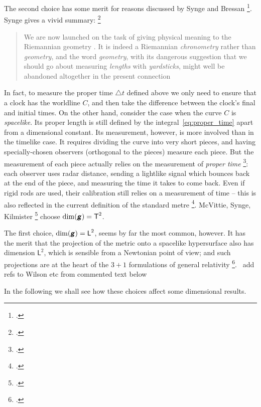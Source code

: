 \documentclass[\ifafour a4paper,12pt,\else a5paper,10pt,\fi%
onecolumn,oneside,article,%
british%
]{memoir}
\theoremstyle{remark}
\theoremstyle{innote}
\newcommand*{\mathte}[1]{\textbf{\textit{\textsf{#1}}}}
\newcommand*{\citep}{\footcites}
\newcommand*{\incr}{\triangle}%
\renewcommand*{\|}[1][]{\nonscript\,#1\vert\nonscript\;\mathopen{}}
\newcommand*{\sect}{\S}%
\newcommand*{\sects}{\S\S}%
\newcommand*{\chap}{ch.}%
\newcommand*{\puzzle}{{\fontencoding{U}\fontfamily{fontawesometwo}\selectfont\symbol{225}}}
\newcommand{\mynote}[1]{ {\color{notecolour}\puzzle\ #1}}
\newcommand*{\Le}{\textsf{L}}
\newcommand*{\Ti}{\textsf{T}}
\newcommand*{\yg}{\mathte{g}}
\newcommand*{\inct}{\incr t}
\begin{document}
The second choice has some merit for reasons discussed by Synge and Bressan
\citep[\sects~III.2--4]{synge1960b}[\sects~15, 18]{bressan1978}. Synge
gives a vivid summary: \citep[\sect~III.3 pp.~108--109]{synge1960b}
\begin{quote}\footnotesize
  We are now launched on the task of giving physical meaning to the
  Riemannian geometry \textelp{}. It is indeed a Riemannian
  \emph{chronometry} rather than \emph{geometry}, and the word
  \emph{geometry}, with its dangerous suggestion that we should go about
  measuring \emph{lengths} with \emph{yardsticks}, might well be abandoned
  altogether in the present connection
\end{quote}
In fact, to measure the proper time $\inct$ defined above we only need to
ensure that a clock has the worldline $C$, and then take the difference
between the clock's final and initial times. On the other hand, consider
the case when the curve $C$ is \emph{spacelike}. Its proper length is still
defined by the integral~\eqref{eq:proper_time} apart from a dimensional
constant. Its measurement, however, is more involved than in the timelike
case. It requires dividing the curve into very short pieces, and having
specially-chosen observers (orthogonal to the pieces) measure each piece.
But the measurement of each piece actually relies on the measurement of
\emph{proper time}
\citep[\chap~2]{frankel1979}[\sect~84]{landauetal1939_t1996}: each observer
uses radar distance, sending a lightlike signal which bounces back at the
end of the piece, and measuring the time it takes to come back. Even if
rigid rods are used, their calibration still relies on a measurement of
time -- this is also reflected in the current definition of the standard
metre \citep[p.~98]{bipm1983}[p.~25]{giacomo1984}. McVittie, Synge,
Kilmister
\citep[\sect~4.1]{mcvittie1956_r1965}[\sect~IV.5]{synge1960b}[\chap~II
p.~25]{kilmister1973} choose $\dim(\yg)=\Ti^{2}$.

The first choice, $\dim(\yg) = \Le^{2}$, seems by far the most common,
however. It has the merit that the projection of the metric onto a
spacelike hypersurface also has dimension $\Le^{2}$, which is sensible from
a Newtonian point of view; and such projections are at the heart of the
$3+1$ formulations of general relativity
\citep{gourgoulhon2007_r2012,alcubierre2008}[\chap~21. I thank I.~Bengtsson
for this remark]{misneretal1970_r1973}.
\mynote{add refs to Wilson etc from commented text below}

In the following we shall see how these choices affect some dimensional
results. %
\end{document}
